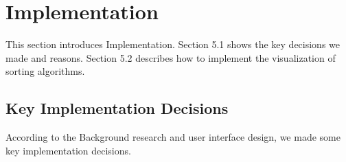 \documentclass[paper=a4, fontsize=11pt,twoside]{scrartcl}		%
\begin{document}
\section{Implementation}
This section introduces Implementation. Section 5.1 shows the key decisions we made and reasons. Section 5.2 describes how to implement the visualization of sorting algorithms.

\subsection{Key Implementation Decisions}

According to the Background research and user interface design, we made some key implementation decisions.
\end{document}
